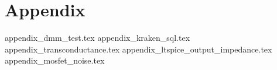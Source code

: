 \documentclass[12pt]{book}
\begin{document}
    \appendix  %
    \chapter{Appendix}
        {appendix_dmm_test.tex}
        \clearpage
        {appendix_kraken_sql.tex}
        \clearpage
        {appendix_transconductance.tex}
        \clearpage
        {appendix_ltspice_output_impedance.tex}
        \clearpage
        {appendix_mosfet_noise.tex}
\end{document}
